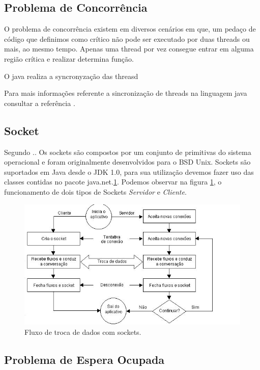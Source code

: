 \documentclass[12pt]{article}
\begin{document}
\subsection{Problema de Concorrência}
O problema de concorrência existem em diversos cenários em que, um pedaço de código que definimos como crítico não pode ser executado por duas threads ou mais, ao mesmo tempo. Apenas uma thread por vez consegue entrar em alguma região crítica e realizar determina função.

	O java realiza a syncronyzação das threasd
	
	Para mais informações referente a sincronização de threads na linguagem java consultar a referência \cite{ct}.

 
\subsection{Socket}

 Segundo \cite{socket}.\cite{conc}.
 Os sockets são compostos por um conjunto de primitivas do sistema operacional e foram originalmente desenvolvidos para o BSD Unix. Sockets são suportados em Java desde o JDK 1.0, para sua utilização devemos fazer uso das classes contidas no pacote java.net.\ref{fluxoSocket}. Podemos observar na figura \ref{fluxoSocket}, o funcionamento de dois tipos de Sockets  \textit{Servidor} e \textit{Cliente}.
\begin{figure}[H]
	\centering
	\includegraphics[scale=1]{imagens/fluxoSocket.JPG}
    \caption{Fluxo de troca de dados com sockets.}
	\label{fluxoSocket}
\end{figure}

 \subsection{Problema de Espera Ocupada} \label{Espera}
 	
\end{document}
